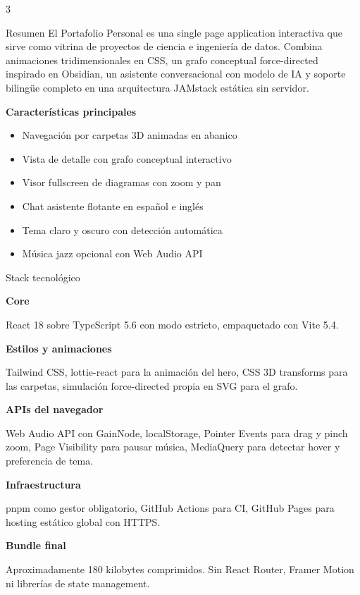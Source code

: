 \documentclass[10pt]{article}
\newcommand{\posterheading}[1]{%
  \vspace{4pt}%
  \par{\color{accentdark}\sffamily\bfseries #1}\par
  \vspace{2pt}%
}
\begin{document}
\setlength{\columnsep}{18pt}
\begin{multicols}{3}


\begin{posterblock}{Resumen}
El Portafolio Personal es una single page application interactiva que sirve como vitrina de proyectos de ciencia e ingeniería de datos. Combina animaciones tridimensionales en CSS, un grafo conceptual force-directed inspirado en Obsidian, un asistente conversacional con modelo de IA y soporte bilingüe completo en una arquitectura JAMstack estática sin servidor.

\posterheading{Características principales}
\begin{itemize}
  \item Navegación por carpetas 3D animadas en abanico
  \item Vista de detalle con grafo conceptual interactivo
  \item Visor fullscreen de diagramas con zoom y pan
  \item Chat asistente flotante en español e inglés
  \item Tema claro y oscuro con detección automática
  \item Música jazz opcional con Web Audio API
\end{itemize}
\end{posterblock}

\begin{posterblock}{Stack tecnológico}
\posterheading{Core}
React 18 sobre TypeScript 5.6 con modo estricto, empaquetado con Vite 5.4.

\posterheading{Estilos y animaciones}
Tailwind CSS, lottie-react para la animación del hero, CSS 3D transforms para las carpetas, simulación force-directed propia en SVG para el grafo.

\posterheading{APIs del navegador}
Web Audio API con GainNode, localStorage, Pointer Events para drag y pinch zoom, Page Visibility para pausar música, MediaQuery para detectar hover y preferencia de tema.

\posterheading{Infraestructura}
pnpm como gestor obligatorio, GitHub Actions para CI, GitHub Pages para hosting estático global con HTTPS.

\posterheading{Bundle final}
Aproximadamente 180 kilobytes comprimidos. Sin React Router, Framer Motion ni librerías de state management.
\end{posterblock}


\end{multicols}
\end{document}
